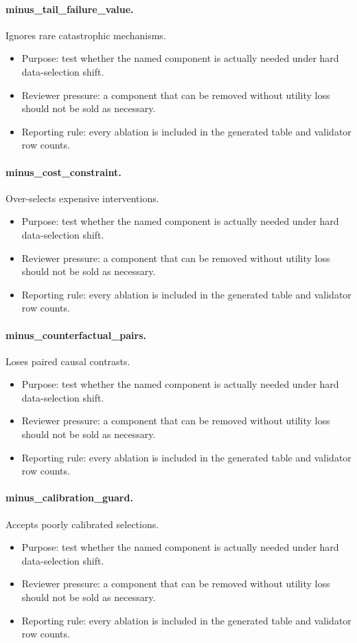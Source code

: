 \documentclass{article}
\begin{document}
\paragraph{minus\_tail\_failure\_value.} Ignores rare catastrophic mechanisms.
\begin{itemize}
\item Purpose: test whether the named component is actually needed under hard data-selection shift.
\item Reviewer pressure: a component that can be removed without utility loss should not be sold as necessary.
\item Reporting rule: every ablation is included in the generated table and validator row counts.
\end{itemize}
\paragraph{minus\_cost\_constraint.} Over-selects expensive interventions.
\begin{itemize}
\item Purpose: test whether the named component is actually needed under hard data-selection shift.
\item Reviewer pressure: a component that can be removed without utility loss should not be sold as necessary.
\item Reporting rule: every ablation is included in the generated table and validator row counts.
\end{itemize}
\paragraph{minus\_counterfactual\_pairs.} Loses paired causal contrasts.
\begin{itemize}
\item Purpose: test whether the named component is actually needed under hard data-selection shift.
\item Reviewer pressure: a component that can be removed without utility loss should not be sold as necessary.
\item Reporting rule: every ablation is included in the generated table and validator row counts.
\end{itemize}
\paragraph{minus\_calibration\_guard.} Accepts poorly calibrated selections.
\begin{itemize}
\item Purpose: test whether the named component is actually needed under hard data-selection shift.
\item Reviewer pressure: a component that can be removed without utility loss should not be sold as necessary.
\item Reporting rule: every ablation is included in the generated table and validator row counts.
\end{itemize}
\end{document}
